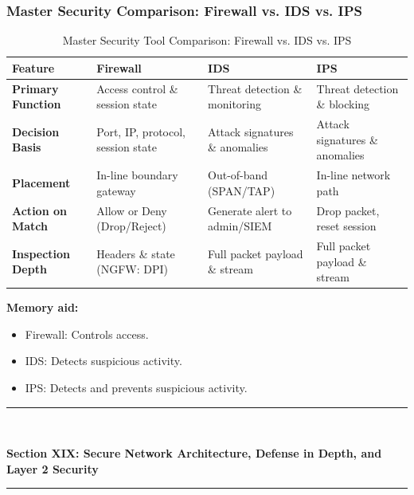 \subsubsection{Master Security Comparison: Firewall vs. IDS vs. IPS}
\begin{table}[htbp]
\centering
\caption{Master Security Tool Comparison: Firewall vs. IDS vs. IPS}
\label{tab:firewall_vs_ids_vs_ips}
\begin{tabularx}{\textwidth}{p{2.8cm} X X X}
\toprule
\textbf{Feature} & \textbf{Firewall} & \textbf{IDS} & \textbf{IPS} \\
\midrule
\textbf{Primary Function} & Access control \& session state & Threat detection \& monitoring & Threat detection \& blocking \\
\textbf{Decision Basis} & Port, IP, protocol, session state & Attack signatures \& anomalies & Attack signatures \& anomalies \\
\textbf{Placement} & In-line boundary gateway & Out-of-band (SPAN/TAP) & In-line network path \\
\textbf{Action on Match} & Allow or Deny (Drop/Reject) & Generate alert to admin/SIEM & Drop packet, reset session \\
\textbf{Inspection Depth} & Headers \& state (NGFW: DPI) & Full packet payload \& stream & Full packet payload \& stream \\
\bottomrule
\end{tabularx}
\end{table}


\textbf{Memory aid:}

\begin{itemize}
\item Firewall: Controls access.
\item IDS: Detects suspicious activity.
\item IPS: Detects and prevents suspicious activity.
\end{itemize}


\newpage
\begin{center}
\vspace{0.5em}
{\color{primary}\rule{0.45\textwidth}{1.2pt}\\[4pt]}
{\Large\bfseries\color{primary} Section XIX: Secure Network Architecture, Defense in Depth, and Layer 2 Security\\[2pt]}
{\color{primary}\rule{0.45\textwidth}{1.2pt}}
\vspace{0.5em}
\end{center}

